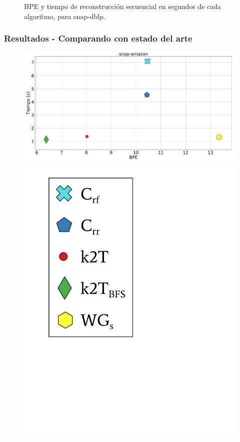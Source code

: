 \begin{frame}
\begin{figure}
	\caption{BPE y tiempo de reconstrucción secuencial en segundos de cada algoritmo, para snap-dblp.}
\end{figure}

\end{frame}

\begin{frame}
\frametitle{Resultados - Comparando con estado del arte}

\begin{figure}
	\centering
	
    	\begin{minipage}{1\textwidth}
    		\centering
    		\begin{minipage}{0.8\textwidth}
    			\centering
    			\includegraphics[width=1\linewidth]{../img/bpeTimes/secuencial/snap-amazon.pdf}
    		\end{minipage}
    		\begin{minipage}{0.15\textwidth}
    			\centering
    			\includegraphics[scale=.16, clip, trim=70 200 280 40]{../img/bpeTimes/labelSec.pdf}

\end{minipage}
\end{minipage}
\end{figure}
\end{frame}
